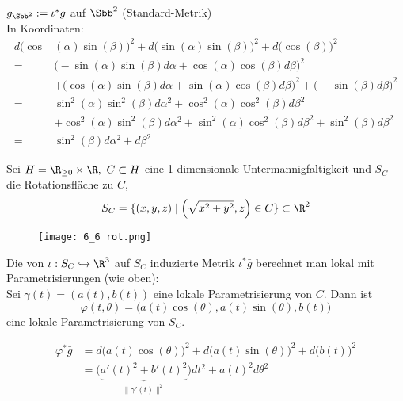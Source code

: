 \begin{exmp*}
	$ g_{\Sbb^2} := \iota^*\bar{g} $ auf $\Sbb^2$ \hfill (Standard-Metrik)\\
	In Koordinaten:
	\begin{align*}
		d\big(\cos&(\alpha) \sin(\beta)\big)^2 + d\big(\sin(\alpha)\sin(\beta)\big)^2 + d\big(\cos(\beta)\big)^2 \\
		=& \big(-\sin(\alpha)\sin(\beta)d\alpha + \cos(\alpha)\cos(\beta)d\beta\big)^2 \\
		&+ \big(\cos(\alpha)\sin(\beta)d\alpha + \sin(\alpha)\cos(\beta)d\beta\big)^2 + \big(-\sin(\beta)d\beta\big)^2\\
		=& \sin^2(\alpha) \sin^2(\beta) d\alpha^2 + \cos^2(\alpha) \cos^2(\beta) d\beta^2\\
		&+ \cos^2(\alpha) \sin^2(\beta) d\alpha^2 + \sin^2(\alpha) \cos^2(\beta) d\beta^2 + \sin^2(\beta) d\beta^2\\
		=& \sin^2(\beta) d\alpha^2 + d\beta^2
	\end{align*}
\end{exmp*}

\begin{exmp*}
	Sei $ H = \R_{\geq 0} \times \R,\ C \subset H $ eine 1-dimensionale Untermannigfaltigkeit und $ S_C $ die Rotationsfläche zu $C$,
	\[ S_C = \{(x,y,z) \mid \left( \sqrt{x^2+y^2},z \right) \in C \} \subset \R^2 \]
	\begin{minipage}{\linewidth}
		\begin{wrapfigure}{l}{6cm}
			\texttt{[image: 6\_6 rot.png]}
		\end{wrapfigure}
		Die von $\iota: S_C \hookrightarrow \R^3$ auf $S_C$ induzierte Metrik $\iota^*\bar{g}$ berechnet man lokal mit Parametrisierungen (wie oben):\\
		Sei $ \gamma(t) = (a(t),b(t)) $ eine lokale Parametrisierung von $C$. Dann ist
		\[ \varphi(t,\theta) = \big( a(t)\cos(\theta), a(t)\sin(\theta),b(t) \big) \]
		eine lokale Parametrisierung von $S_C$.
	\end{minipage}
	\begin{align*}
		\varphi^*\bar{g} &= d\big( a(t)\cos(\theta) \big)^2 + d\big( a(t)\sin(\theta) \big)^2 + d\big( b(t) \big)^2\\
		&= \big( \underbrace{a'(t)^2 + b'(t)^2}_{\|\gamma'(t)\|^2} \big)dt^2 + a(t)^2d\theta^2
	\end{align*}
\end{exmp*}

\subsection*{}

